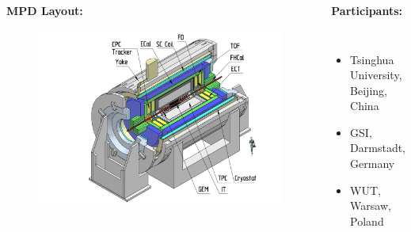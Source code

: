 \documentclass[dvipsnames] {beamer}
\begin{document}
      \begin{frame}
        \frametitle{\bf {}}
        \bf
        \vskip -0.25cm
        \begin{columns}[t]
          \vskip -0.5cm
          \begin{block}{\bf \centering MPD Layout:}
            \begin{figure}[H]
              \includegraphics[width=1.\textwidth]{mpd.png} 
            \end{figure}
          \end{block}
          \vskip -0.3cm
                 {\tiny 
                   \begin{block}{\bf \centering Participants:}
                     
                     \begin{columns}[t]
                       
                       \vskip -0.4cm
                       \begin{itemize}
                       \item Tsinghua University, Beijing, China
                       \item GSI, Darmstadt, Germany
                       \item WUT, Warsaw, Poland
                       \end{itemize}
                       

\end{columns}
\end{block}}
\end{columns}
\end{frame}
\end{document}
